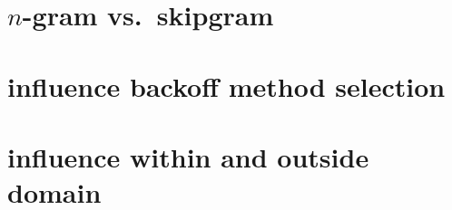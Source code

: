 \section{$n$-gram vs.\ skipgram}
\section{influence backoff method selection}
\section{influence within and outside domain}